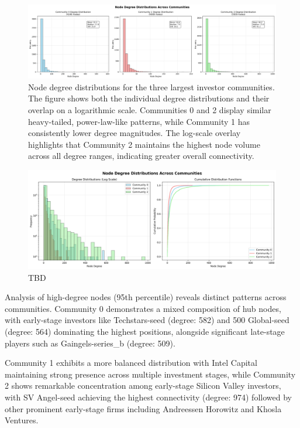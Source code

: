 \begin{figure}[ht]
\centering
\includegraphics[width=1\textwidth]{../figures/us/node_degree_distributions_comprehensive_pt1.png}
\caption{Node degree distributions for the three largest investor communities. The figure shows both the individual degree distributions and their overlap on a logarithmic scale. Communities 0 and 2 display similar heavy-tailed, power-law-like patterns, while Community 1 has consistently lower degree magnitudes. The log-scale overlay highlights that Community 2 maintains the highest node volume across all degree ranges, indicating greater overall connectivity.}
\label{fig:node_degree_distributions}
\end{figure}

\begin{figure}[ht]
\centering
\includegraphics[width=1\textwidth]{../figures/us/node_degree_distributions_comprehensive_pt2.png}
\caption{TBD}
\label{fig:node_degree_distributions}
\end{figure}

Analysis of high-degree nodes (95th percentile) reveals distinct patterns across communities. Community 0 demonstrates a mixed composition of hub nodes, with early-stage investors like Techstars-seed (degree: 582) and 500 Global-seed (degree: 564) dominating the highest positions, alongside significant late-stage players such as Gaingels-series\_b (degree: 509). 

Community 1 exhibits a more balanced distribution with Intel Capital maintaining strong presence across multiple investment stages, while Community 2 shows remarkable concentration among early-stage Silicon Valley investors, with SV Angel-seed achieving the highest connectivity (degree: 974) followed by other prominent early-stage firms including Andreessen Horowitz and Khosla Ventures.

